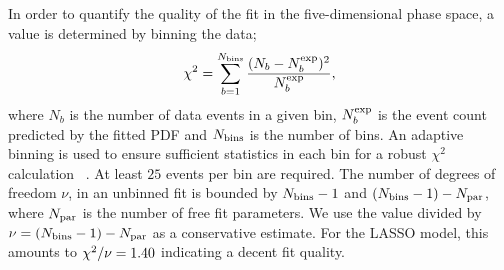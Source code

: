 In order to quantify the quality of the fit in the five-dimensional phase space,
a \chisq value is determined by binning the data;
\begin{equation}
	\chi^{2} = \sum_{b=1}^{N_{\rm bins}} \frac{(N_{b}-N_{b}^{\rm exp})^{2}}{N_{b}^{\rm exp}},
\end{equation}
where $N_{b}$ is the number of data events in a given bin, 
$N_{b}^{\rm exp}$ is the event count predicted by the fitted PDF
and $N_{\rm bins}$ is the number of bins.
An adaptive binning
is used to ensure sufficient statistics in each bin for a robust $\chi^{2}$ calculation ~\cite{KKpipi}.
At least $25$ events per bin are required.
The number of degrees of freedom $\nu$, in an unbinned fit is bounded by $N_{\rm bins}-1$ and $(N_{\rm bins}- 1) - N_{\rm par}$, 
where $N_{\rm par}$ is the number of free fit parameters.
We use the \chisq value divided by $\nu = (N_{\rm bins}-1) - N_{\rm par}$ as a conservative estimate.
For the LASSO model, this 
amounts to $\chi^2/\nu = 1.40$ %
indicating a decent fit quality.


